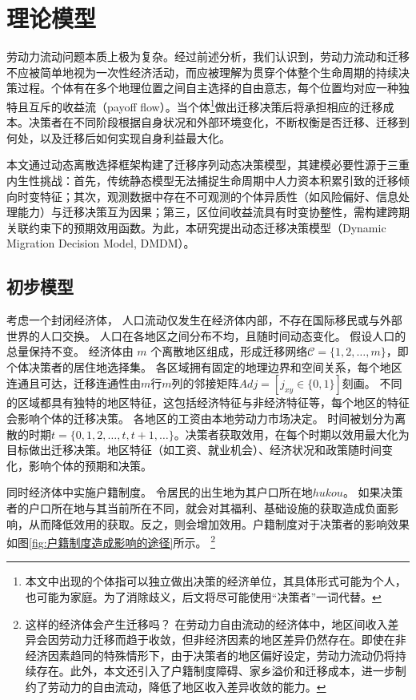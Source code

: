 \documentclass[a4paper,12pt,oneside, fontset=mac]{ctexbook} %
\begin{document}
\chapter{理论模型}

劳动力流动问题本质上极为复杂。经过前述分析，我们认识到，劳动力流动和迁移不应被简单地视为一次性经济活动，而应被理解为贯穿个体整个生命周期的持续决策过程。个体有在多个地理位置之间自主选择的自由意志，每个位置均对应一种独特且互斥的收益流（payoff flow）。当个体\footnote{本文中出现的个体指可以独立做出决策的经济单位，其具体形式可能为个人，也可能为家庭。为了消除歧义，后文将尽可能使用“决策者”一词代替。}做出迁移决策后将承担相应的迁移成本。决策者在不同阶段根据自身状况和外部环境变化，不断权衡是否迁移、迁移到何处，以及迁移后如何实现自身利益最大化。

本文通过动态离散选择框架构建了迁移序列动态决策模型，其建模必要性源于三重内生性挑战：首先，传统静态模型无法捕捉生命周期中人力资本积累引致的迁移倾向时变特征；其次，观测数据中存在不可观测的个体异质性（如风险偏好、信息处理能力）与迁移决策互为因果；第三，区位间收益流具有时变协整性，需构建跨期关联约束下的预期效用函数。为此，本研究提出动态迁移决策模型（Dynamic Migration Decision Model, DMDM）。

\section{初步模型}

考虑一个封闭经济体，
人口流动仅发生在经济体内部，不存在国际移民或与外部世界的人口交换。
人口在各地区之间分布不均，且随时间动态变化。
假设人口的总量保持不变。
经济体由 $m$ 个离散地区组成，形成迁移网络$\mathcal{C} = \{1,2,\dots,m\}$，即个体决策者的居住地选择集。
各区域拥有固定的地理边界和空间关系，每个地区连通且可达，迁移连通性由$m$行$m$列的邻接矩阵$Adj=[j_{xy}\in\{0,1\}]$刻画。
不同的区域都具有独特的地区特征，这包括经济特征与非经济特征等，每个地区的特征会影响个体的迁移决策。
各地区的工资由本地劳动力市场决定。
时间被划分为离散的时期$t=\{0,1,2,\ldots,t,t+1,\ldots\}$。决策者获取效用，在每个时期以效用最大化为目标做出迁移决策。地区特征（如工资、就业机会）、经济状况和政策随时间变化，影响个体的预期和决策。

同时经济体中实施户籍制度。
令居民的出生地为其户口所在地$hukou$。
如果决策者的户口所在地与其当前所在不同，就会对其福利、基础设施的获取造成负面影响，从而降低效用的获取。反之，则会增加效用。户籍制度对于决策者的影响效果如图\ref{fig:户籍制度造成影响的途径}所示。
\footnote{
这样的经济体会产生迁移吗？
在劳动力自由流动的经济体中，地区间收入差异会因劳动力迁移而趋于收敛，但非经济因素的地区差异仍然存在。即使在非经济因素趋同的特殊情形下，由于决策者的地区偏好设定，劳动力流动仍将持续存在。此外，本文还引入了户籍制度障碍、家乡溢价和迁移成本，进一步制约了劳动力的自由流动，降低了地区收入差异收敛的能力。
}
\end{document}
